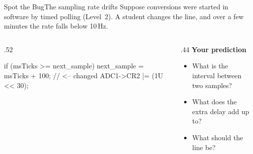 \documentclass[9pt,aspectratio=169,xcolor=table]{beamer}
\begin{document}
{\beamerextras
\begin{frame}[fragile]{Spot the Bug}{The sampling rate drifts}
    \leavevmode
    Suppose conversions were started in software by timed polling (Level~2). A student changes the line, and over a few minutes the rate falls below 10\,Hz.

    \vspace{2mm}
    \begin{columns}[T]
    \begin{column}{.52\textwidth}
\begin{cc}[basicstyle=\ttfamily\small]
if (msTicks >= next_sample) {
    next_sample = msTicks + 100;   // <-- changed
    ADC1->CR2 |= (1U << 30);
}
\end{cc}
    \end{column}
    \begin{column}{.44\textwidth}
        \textbf{Your prediction}
        {\small
        \begin{itemize}\itemsep2pt
            \item What is the interval between two samples?
            \item What does the extra delay add up to?
            \item What should the line be?
        \end{itemize}}
    \end{column}
    \end{columns}

    \vspace{2mm}
\end{frame}
}
\end{document}
